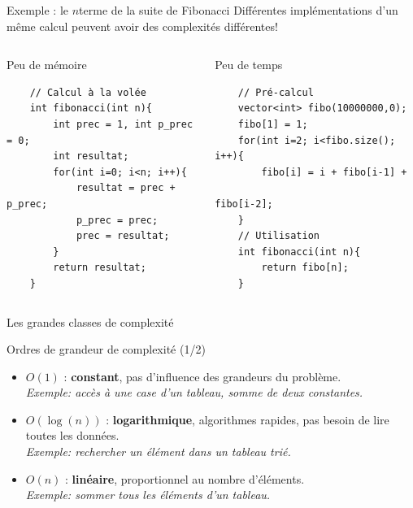 \begin{frame}[fragile]{Exemple : le $n$\ieme terme de la suite de Fibonacci}
Différentes implémentations d'un même calcul peuvent avoir des complexités différentes!
\begin{columns}[T]
    \begin{column}{0.5\textwidth}
    \begin{block}{Peu de mémoire}
    \begin{verbatim}
    // Calcul à la volée
    int fibonacci(int n){
        int prec = 1, int p_prec = 0;
        int resultat;
        for(int i=0; i<n; i++){
            resultat = prec + p_prec;
            p_prec = prec;
            prec = resultat;
        }
        return resultat;
    }
    \end{verbatim}
    \end{block}
    \end{column}
    \begin{column}{0.5\textwidth}
    \begin{block}{Peu de temps}
    \begin{verbatim}
    // Pré-calcul
    vector<int> fibo(10000000,0);
    fibo[1] = 1;
    for(int i=2; i<fibo.size(); i++){
        fibo[i] = i + fibo[i-1] +
                             fibo[i-2];
    }
    // Utilisation
    int fibonacci(int n){
        return fibo[n];
    }
    \end{verbatim}
    \end{block}
    \end{column}
\end{columns}
\end{frame}


\begin{frame}{Les grandes classes de complexité}
\begin{block}{Ordres de grandeur de complexité (1/2)}
\begin{itemize}
\item $O(1)$ : \textbf{constant}, pas d'influence des grandeurs du problème. \\
	\textit{\small Exemple: accès à une case d'un tableau, somme de deux constantes.}
\item $O(\log(n))$ : \textbf{logarithmique}, algorithmes rapides, pas besoin de lire toutes les données.\\
	\textit{\small Exemple: rechercher un élément dans un tableau trié.}
\item $O(n)$ : \textbf{linéaire}, proportionnel au nombre d'éléments.\\
	\textit{\small Exemple: sommer tous les éléments d'un tableau.}
\end{itemize}
\end{block}
\end{frame}

